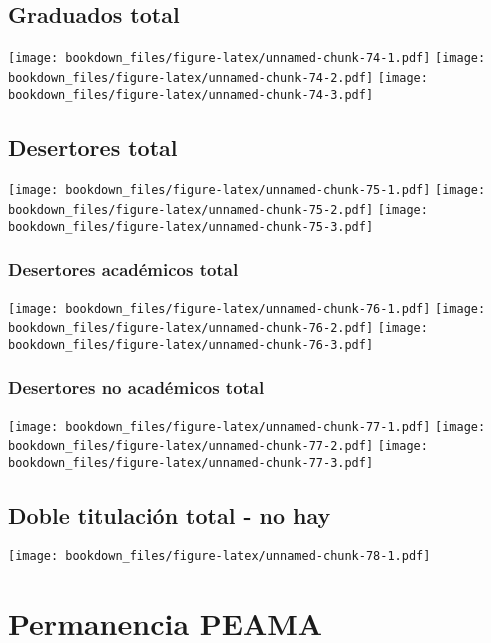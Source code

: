\documentclass[]{article}
\theoremstyle{definition}
\theoremstyle{definition}
\theoremstyle{definition}
\theoremstyle{remark}
\begin{document}
\subsection{Graduados total}\label{graduados-total}

\texttt{[image: bookdown\_files/figure-latex/unnamed-chunk-74-1.pdf]}
\texttt{[image: bookdown\_files/figure-latex/unnamed-chunk-74-2.pdf]}
\texttt{[image: bookdown\_files/figure-latex/unnamed-chunk-74-3.pdf]}

\subsection{Desertores total}\label{desertores-total}

\texttt{[image: bookdown\_files/figure-latex/unnamed-chunk-75-1.pdf]}
\texttt{[image: bookdown\_files/figure-latex/unnamed-chunk-75-2.pdf]}
\texttt{[image: bookdown\_files/figure-latex/unnamed-chunk-75-3.pdf]}

\subsubsection{Desertores académicos
total}\label{desertores-academicos-total}

\texttt{[image: bookdown\_files/figure-latex/unnamed-chunk-76-1.pdf]}
\texttt{[image: bookdown\_files/figure-latex/unnamed-chunk-76-2.pdf]}
\texttt{[image: bookdown\_files/figure-latex/unnamed-chunk-76-3.pdf]}

\subsubsection{Desertores no académicos
total}\label{desertores-no-academicos-total}

\texttt{[image: bookdown\_files/figure-latex/unnamed-chunk-77-1.pdf]}
\texttt{[image: bookdown\_files/figure-latex/unnamed-chunk-77-2.pdf]}
\texttt{[image: bookdown\_files/figure-latex/unnamed-chunk-77-3.pdf]}

\subsection{Doble titulación total - no
hay}\label{doble-titulacion-total---no-hay}

\texttt{[image: bookdown\_files/figure-latex/unnamed-chunk-78-1.pdf]}

\section{Permanencia PEAMA}\label{permanencia-peama}
\end{document}

